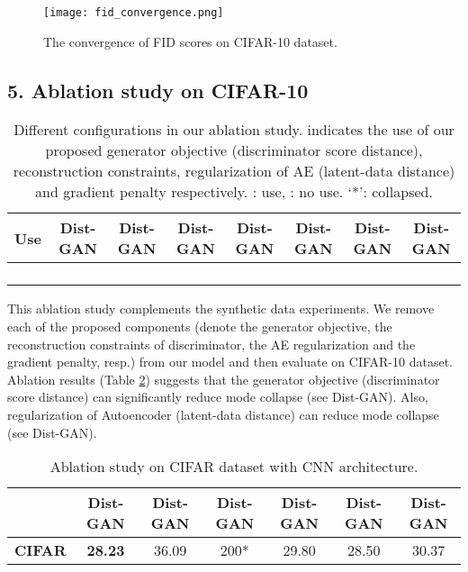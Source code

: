 \documentclass[runningheads]{llncs}
\begin{document}
\begin{figure}
\centering
\scriptsize
\texttt{[image: fid\_convergence.png]}
\vspace*{-4mm}\caption{The convergence of FID scores on CIFAR-10 dataset.}
\label{fid_curve}
\end{figure}


\subsection*{5. Ablation study on CIFAR-10}

\begin{table}
\centering
\scriptsize
\caption{Different configurations in our ablation study.  indicates the use of our proposed generator objective (discriminator score distance), reconstruction constraints, regularization of AE (latent-data distance) and gradient penalty respectively. : use, : no use. `*': collapsed.}
\begin{tabular}{c | c | c | c | c | c | c | c }
\hline
 Use & \textbf{Dist-GAN} & \textbf{Dist-GAN} & \textbf{Dist-GAN} & \textbf{Dist-GAN} & \textbf{Dist-GAN} & \textbf{Dist-GAN} & \textbf{Dist-GAN} \\
\hline
 &  &  &  &  &  &  &  \\
 &  &  &  &  &  &  &  \\
 &  &  &  &  &  &  &  \\
 &  &  &  &  &  &  & 
\end{tabular}
\label{setting_ablation}
\end{table}

This ablation study complements the synthetic data experiments. We remove each of the proposed components  (denote the generator objective, the reconstruction constraints of discriminator, the AE regularization and the gradient penalty, resp.) from our model and then evaluate on CIFAR-10 dataset. Ablation results (Table \ref{fid_score_ablation}) suggests that the generator objective (discriminator score distance) can significantly reduce mode collapse (see Dist-GAN). Also,  regularization of Autoencoder (latent-data distance) can reduce mode collapse (see Dist-GAN).



\begin{table}
\centering
\scriptsize
\caption{Ablation study on CIFAR dataset with CNN architecture.}
\begin{tabular}{c | c | c | c | c | c | c }
\hline
 & \textbf{Dist-GAN} & \textbf{Dist-GAN}  & \textbf{Dist-GAN} & \textbf{Dist-GAN} & \textbf{Dist-GAN} & \textbf{Dist-GAN} \\
\hline
\textbf{CIFAR} & \textbf{28.23} & 36.09 & 200* & 29.80 & 28.50 & 30.37 \\
\end{tabular}
\label{fid_score_ablation}
\end{table}
 
\end{document}
